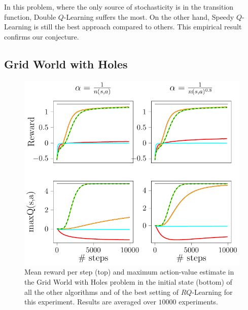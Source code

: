 In this problem, where the only source of stochasticity is in the transition function, Double $Q$-Learning suffers the most. On the other hand, Speedy $Q$-Learning is still the best approach compared to others. This empirical result confirms our conjecture.
\subsection{Grid World with Holes}
\begin{figure}[t]
\begin{minipage}{\columnwidth}
\centering
  \includegraphics[scale=.7]{./img/grid_hole.pdf}
\end{minipage}
  \caption[Grid World with Holes algorithms comparison - 1]{Mean reward per step (top) and maximum action-value estimate in the Grid World with Holes problem in the initial state (bottom) of all the other algorithms and of the best setting of $RQ$-Learning for this experiment. Results are averaged over $10000$ experiments.}
  \label{F:hole}
\end{figure}

